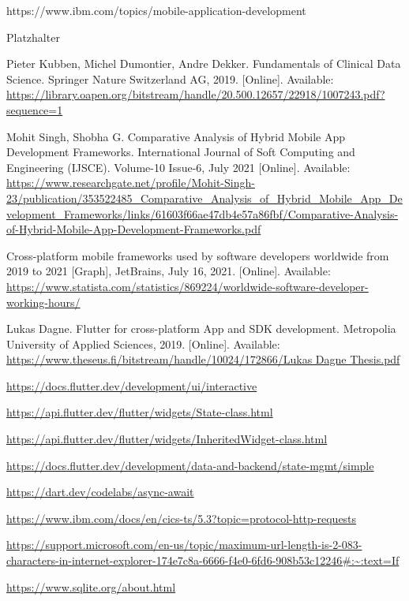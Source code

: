  https://www.ibm.com/topics/mobile-application-development

 Platzhalter

 Pieter Kubben, Michel Dumontier, Andre Dekker. Fundamentals of Clinical Data Science. Springer Nature Switzerland AG, 2019. [Online]. Available: \url{https://library.oapen.org/bitstream/handle/20.500.12657/22918/1007243.pdf?sequence=1}

 Mohit Singh, Shobha G. Comparative Analysis of Hybrid Mobile App Development Frameworks. International Journal of Soft Computing and Engineering (IJSCE). Volume-10 Issue-6, July 2021 [Online]. Available: \url{https://www.researchgate.net/profile/Mohit-Singh-23/publication/353522485_Comparative_Analysis_of_Hybrid_Mobile_App_Development_Frameworks/links/61603f66ae47db4e57a86fbf/Comparative-Analysis-of-Hybrid-Mobile-App-Development-Frameworks.pdf}

 Cross-platform mobile frameworks used by software developers worldwide from 2019 to 2021 [Graph], JetBrains, July 16, 2021. [Online]. Available: \url{https://www.statista.com/statistics/869224/worldwide-software-developer-working-hours/}

 Lukas Dagne. Flutter for cross-platform App and SDK development. Metropolia University of Applied Sciences, 2019. [Online]. Available: \url{https://www.theseus.fi/bitstream/handle/10024/172866/Lukas Dagne Thesis.pdf}

 \url{https://docs.flutter.dev/development/ui/interactive}

 \url{https://api.flutter.dev/flutter/widgets/State-class.html}

 \url{https://api.flutter.dev/flutter/widgets/InheritedWidget-class.html}

 \url{https://docs.flutter.dev/development/data-and-backend/state-mgmt/simple}

 \url{https://dart.dev/codelabs/async-await}

 \url {https://www.ibm.com/docs/en/cics-ts/5.3?topic=protocol-http-requests}

 \url {https://support.microsoft.com/en-us/topic/maximum-url-length-is-2-083-characters-in-internet-explorer-174e7c8a-6666-f4e0-6fd6-908b53c12246#:~:text=If}

 \url {https://www.sqlite.org/about.html}

